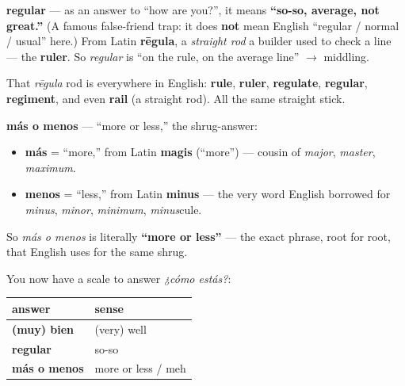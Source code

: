 \begin{cousinweb}
\textbf{regular} — as an answer to \textquotedblleft{}how are you?\textquotedblright{}, it means \textbf{\textquotedblleft{}so-so, average, not great.\textquotedblright{}} (A famous false-friend trap: it does \textbf{not} mean English \textquotedblleft{}regular / normal / usual\textquotedblright{} here.) From Latin \textbf{rēgula}, a \emph{straight rod} a builder used to check a line — the \textbf{ruler}. So \emph{regular} is \textquotedblleft{}on the rule, on the average line\textquotedblright{} $\to$ middling.

That \emph{rēgula} rod is everywhere in English: \textbf{rule}, \textbf{ruler}, \textbf{regulate}, \textbf{regular}, \textbf{regiment}, and even \textbf{rail} (a straight rod). All the same straight stick.

\textbf{más o menos} — \textquotedblleft{}more or less,\textquotedblright{} the shrug-answer:

\begin{itemize}
\raggedright
  \item \textbf{más} = \textquotedblleft{}more,\textquotedblright{} from Latin \textbf{magis} (\textquotedblleft{}more\textquotedblright{}) — cousin of \emph{major}, \emph{master}, \emph{maximum}.
  \item \textbf{menos} = \textquotedblleft{}less,\textquotedblright{} from Latin \textbf{minus} — the very word English borrowed for \emph{minus}, \emph{minor}, \emph{minimum}, \emph{minus}cule.
\end{itemize}

So \emph{más o menos} is literally \textbf{\textquotedblleft{}more or less\textquotedblright{}} — the exact phrase, root for root, that English uses for the same shrug.
\end{cousinweb}

\begin{grammarlens}[title={Grammar Lens: a small answer set}]
You now have a scale to answer \emph{¿cómo estás?}:

\noindent
\begin{tabularx}{\linewidth}{@{}>{\raggedright\arraybackslash}X>{\raggedright\arraybackslash}X@{}}
\toprule
\textbf{answer} & \textbf{sense} \\
\midrule
\textbf{(muy) bien} & (very) well \\
\textbf{regular} & so-so \\
\textbf{más o menos} & more or less / meh \\
\bottomrule
\end{tabularx}
\end{grammarlens}

